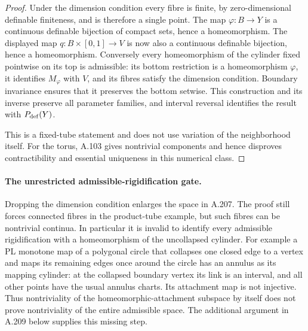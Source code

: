 \begin{proof}
Under the dimension condition every fibre is finite, by
zero-dimensional definable finiteness, and is therefore a single
point. The map $\varphi:B\to Y$ is a continuous definable
bijection of compact sets, hence a homeomorphism. The displayed
map $q:B\times[0,1]\to V$ is now also a continuous definable
bijection, hence a homeomorphism. Conversely every homeomorphism
of the cylinder fixed pointwise on its top is admissible: its
bottom restriction is a homeomorphism $\varphi$, it identifies
$M_\varphi$ with $V$, and its fibres satisfy the dimension
condition. Boundary invariance ensures that it preserves the
bottom setwise. This construction and its inverse preserve all
parameter families, and interval reversal identifies the result
with $P_{\rm def}(Y)$.

This is a fixed-tube statement and does not use variation of the
neighborhood itself. For the torus, A.103 gives nontrivial
components and hence disproves contractibility and essential
uniqueness in this numerical class.
\end{proof}

\paragraph{The unrestricted admissible-rigidification gate.}
Dropping the dimension condition enlarges the space in A.207.
The proof still forces connected fibres in the product-tube
example, but such fibres can be nontrivial continua. In
particular it is invalid to identify every admissible
rigidification with a homeomorphism of the uncollapsed cylinder.
For example a PL monotone map of a polygonal circle that collapses
one closed edge to a vertex and maps its remaining edges once
around the circle has an annulus as its mapping cylinder: at
the collapsed boundary vertex its link is an interval, and all
other points have the usual annulus charts. Its attachment map
is not injective. Thus nontriviality of the homeomorphic-attachment subspace by
itself does not prove nontriviality of the entire admissible space.
The additional argument in A.209 below supplies this missing step.

